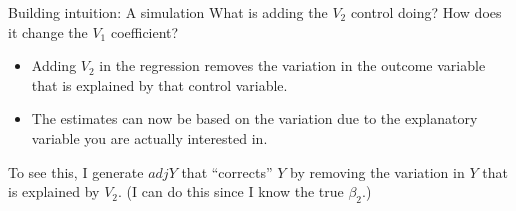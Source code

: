 \documentclass[
  ignorenonframetext,
]{beamer}
\newenvironment{Shaded}{\begin{snugshade}}{\end{snugshade}}
\newcommand{\NormalTok}[1]{#1}
\newcommand{\OperatorTok}[1]{\textcolor[rgb]{0.81,0.36,0.00}{\textbf{#1}}}
\begin{document}
\begin{frame}[fragile]{Building intuition: A simulation}
\protect\hypertarget{building-intuition-a-simulation-4}{}
What is adding the \(V_2\) control doing? How does it change the \(V_1\)
coefficient?

\begin{itemize}
\item
  Adding \(V_2\) in the regression removes the variation in the outcome
  variable that is explained by that control variable.
\item
  The estimates can now be based on the variation due to the explanatory
  variable you are actually interested in.
\end{itemize}

To see this, I generate \(adjY\) that ``corrects'' \(Y\) by removing the
variation in \(Y\) that is explained by \(V_2\). (I can do this since I
know the true \(\beta_2\).)

\begin{Shaded}
\end{Shaded}
\end{frame}
\end{document}
